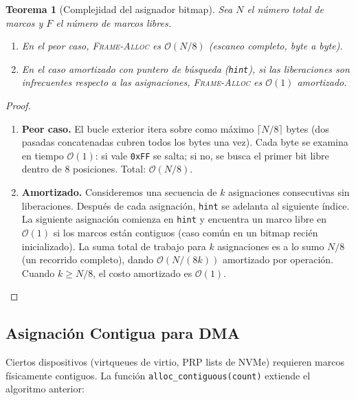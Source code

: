 \documentclass[11pt,twoside,openright]{book}
\theoremstyle{definition}
\theoremstyle{plain}
\newtheorem{theorem}{Teorema}[chapter]
\theoremstyle{remark}
\newcommand{\bigO}{\mathcal{O}}
\begin{document}
\begin{theorem}[Complejidad del asignador bitmap]
\label{thm:bitmap-complexity}
Sea $N$ el número total de marcos y $F$ el número de marcos libres.
\begin{enumerate}
    \item En el peor caso, \textsc{Frame-Alloc} es $\bigO(N/8)$ (escaneo completo,
          byte a byte).
    \item En el caso amortizado con puntero de búsqueda (\texttt{hint}),
          si las liberaciones son infrecuentes respecto a las asignaciones,
          \textsc{Frame-Alloc} es $\bigO(1)$ amortizado.
\end{enumerate}
\end{theorem}

\begin{proof}
\begin{enumerate}
    \item \textbf{Peor caso.} El bucle exterior itera sobre como máximo $\lceil N/8 \rceil$ bytes
          (dos pasadas concatenadas cubren todos los bytes una vez).
          Cada byte se examina en tiempo $\bigO(1)$: si vale \texttt{0xFF} se salta;
          si no, se busca el primer bit libre dentro de 8 posiciones.
          Total: $\bigO(N/8)$.

    \item \textbf{Amortizado.} Consideremos una secuencia de $k$ asignaciones consecutivas
          sin liberaciones. Después de cada asignación, \texttt{hint} se adelanta al
          siguiente índice. La siguiente asignación comienza en \texttt{hint} y encuentra
          un marco libre en $\bigO(1)$ si los marcos están contiguos (caso común en un
          bitmap recién inicializado). La suma total de trabajo para $k$ asignaciones
          es a lo sumo $N/8$ (un recorrido completo), dando $\bigO(N/(8k))$ amortizado
          por operación. Cuando $k \geq N/8$, el costo amortizado es $\bigO(1)$. \qedhere
\end{enumerate}
\end{proof}

\subsection{Asignación Contigua para DMA}

Ciertos dispositivos (virtqueues de virtio, PRP lists de NVMe) requieren marcos
físicamente contiguos. La función \texttt{alloc\_contiguous(count)} extiende el
algoritmo anterior:
\end{document}
